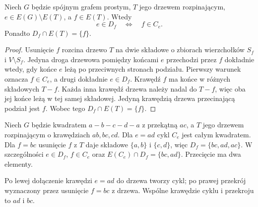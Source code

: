 \begin{stwierdzenie}
Niech $G$ będzie spójnym grafem prostym,
$T$ jego drzewem rozpinającym, $e\in E(G)\setminus E(T)$,
a $f\in E(T)$. Wtedy
\[
e\in D_f\quad\Longleftrightarrow\quad f\in C_e.
\]
Ponadto $D_f\cap E(T)=\{f\}$.
\end{stwierdzenie}

\begin{proof}
Usunięcie $f$ rozcina drzewo $T$ na
dwie składowe o zbiorach wierzchołków
$S_f$ i $V\setminus S_f$. Jedyna droga
drzewowa pomiędzy końcami $e$ przechodzi
przez $f$ dokładnie wtedy, gdy końce
$e$ leżą po przeciwnych stronach podziału.
Pierwszy warunek oznacza $f\in C_e$,
a drugi dokładnie $e\in D_f$.
Krawędź $f$ ma końce w różnych składowych $T-f$.
Każda inna krawędź drzewa należy nadal do $T-f$,
więc oba jej końce leżą w tej samej składowej.
Jedyną krawędzią drzewa przecinającą podział jest $f$.
Wobec tego $D_f\cap E(T)=\{f\}$.
\end{proof}

\begin{przyklad}
Niech $G$ będzie kwadratem $a-b-c-d-a$ z przekątną $ac$,
a $T$ jego drzewem rozpinającym o krawędziach $ab,bc,cd$.
Dla $e=ad$ cykl $C_e$ jest całym kwadratem.
Dla $f=bc$ usunięcie $f$ z $T$ daje składowe
$\{a,b\}$ i $\{c,d\}$, więc $D_f=\{bc,ad,ac\}$.
W szczególności $e\in D_f$, $f\in C_e$ oraz
$E(C_e)\cap D_f=\{bc,ad\}$. Przecięcie ma dwa elementy.
\end{przyklad}

\begin{center}
\begin{minipage}{\linewidth}
\centering
{}

{\footnotesize Po lewej dołączenie krawędzi $e=ad$ do drzewa
tworzy cykl; po prawej przekrój wyznaczony przez usunięcie
$f=bc$ z drzewa. Wspólne krawędzie cyklu i przekroju to $ad$ i $bc$.}
\end{minipage}
\end{center}

